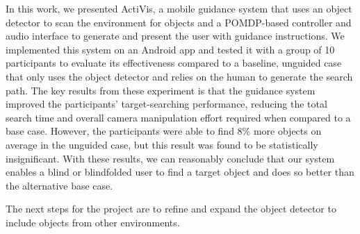 \documentclass[runningheads]{llncs}
\begin{document}
In this work, we presented ActiVis, a mobile guidance system that uses an object detector to scan the environment for objects and a POMDP-based controller and audio interface to generate and present the user with guidance instructions. 
We implemented this system on an Android app and tested it with a group of 10 participants to evaluate its effectiveness compared to a baseline, unguided case that only uses the object detector and relies on the human to generate the search path. 
The key results from these experiment is that the guidance system improved the participants' target-searching performance, reducing the total search time and overall camera manipulation effort required when compared to a base case.
However, the participants were able to find 8\% more objects on average in the unguided case, but this result was found to be statistically insignificant. 
With these results, we can reasonably conclude that our system enables a blind or blindfolded user to find a target object and does so better than the alternative base case.

The next steps for the project are to refine and expand the object detector to include objects from other environments. 



\end{document}
